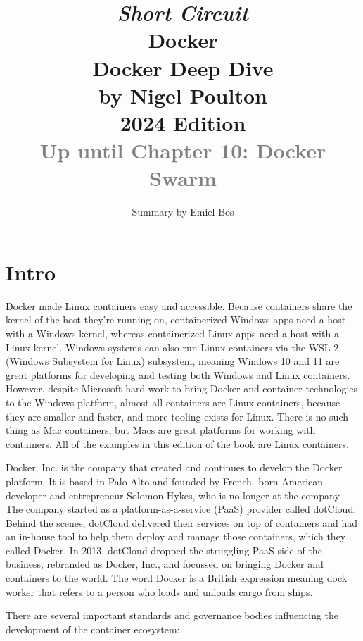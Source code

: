\documentclass[8pt, table, xcdraw]{article}%
\title{
\textit{Short Circuit}\\
\vspace{15px}
\huge
Docker\\
\vspace{20px}
\large
Docker Deep Dive\\
by Nigel Poulton\\
2024 Edition\\
\textcolor{gray}{Up until Chapter 10: Docker Swarm}
}
\author{Summary by Emiel Bos}
\date{}
\begin{document}
\maketitle

\section{Intro}

Docker made Linux containers easy and accessible. Because containers share the kernel of the host they’re running on, containerized Windows apps need a host with a Windows kernel, whereas containerized Linux apps need a host with a Linux kernel. Windows systems can also run Linux containers via the WSL 2 (Windows Subsystem for Linux) subsystem, meaning Windows 10 and 11 are great platforms for developing and testing both Windows and Linux containers. However, despite Microsoft hard work to bring Docker and container technologies to the Windows platform, almost all containers are Linux containers, because they are smaller and faster, and more tooling exists for Linux. There is no such thing as Mac containers, but Macs are great platforms for working with containers. All of the examples in this edition of the book are Linux containers.

Docker, Inc. is the company that created and continues to develop the Docker platform. It is based in Palo Alto and founded by French-
born American developer and entrepreneur Solomon Hykes, who is no longer at the company. The company started as a platform-as-a-service (PaaS) provider called dotCloud. Behind the scenes, dotCloud delivered their services on top of containers and had an in-house tool to
help them deploy and manage those containers, which they called Docker. In 2013, dotCloud dropped the struggling PaaS side of the business, rebranded as Docker, Inc., and focussed on bringing Docker and containers to the world. The word Docker is a British expression meaning dock worker that refers to a person who loads and unloads cargo from ships.

There are several important standards and governance bodies influencing the development of the container ecosystem:
\end{document}
